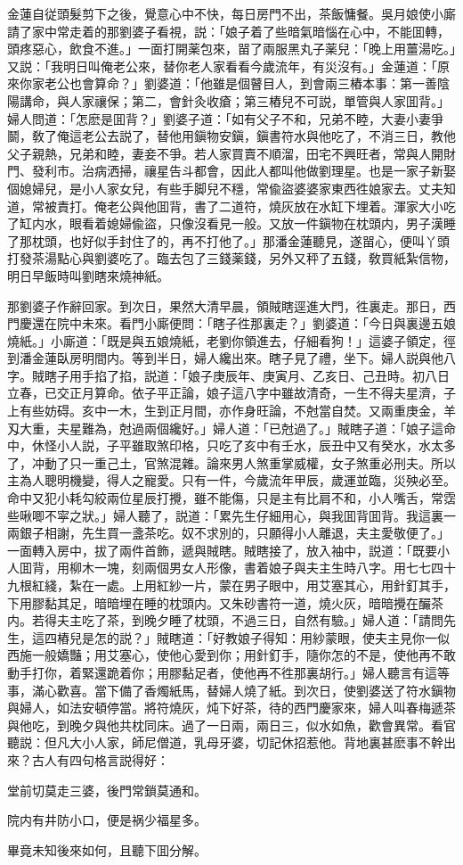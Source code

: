 金蓮自従頭髮剪下之後，覺意心中不快，每日房門不出，茶飯慵餐。吳月娘使小廝請了家中常走着的那劉婆子看視，説：「娘子着了些暗氣暗惱在心中，不能囬轉，頭疼惡心，飲食不進。」一面打開薬包來，㽞了兩服黑丸子薬兒：「晚上用薑湯吃。」又説：「我明日叫俺老公來，替你老人家看看今歲流年，有災沒有。」金蓮道：「原來你家老公也會算命？」劉婆道：「他雖是個瞽目人，到會兩三樁本事：第一善陰陽講命，與人家禳保；第二，會針灸收瘡；第三樁兒不可説，單管與人家囬背。」婦人問道：「怎麽是囬背？」劉婆子道：「如有父子不和，兄弟不睦，大妻小妻爭鬬，敎了俺這老公去説了，替他用鎭物安鎭，鎭書符水與他吃了，不消三日，教他父子親熱，兄弟和睦，妻妾不爭。若人家買賣不順溜，田宅不興旺者，常與人開財門、發利市。治病洒掃，禳星告斗都會，因此人都叫他做劉理星。也是一家子新娶個媳婦兒，是小人家女兒，有些手脚兒不穩，常偸盜婆婆家東西徃娘家去。丈夫知道，常被責打。俺老公與他囬背，書了二道符，燒灰放在水缸下埋着。渾家大小吃了缸内水，眼看着媳婦偸盜，只像沒看見一般。又放一件鎭物在枕頭内，男子漢睡了那枕頭，也好似手封住了的，再不打他了。」那潘金蓮聽見，遂㽞心，便叫丫頭打發茶湯點心與劉婆吃了。臨去包了三錢薬錢，另外又秤了五錢，敎買紙紮信物，明日早飯時叫劉瞎來燒神紙。

那劉婆子作辭回家。到次日，果然大清早晨，領賊瞎逕進大門，徃裏走。那日，西門慶還在院中未來。看門小廝便問：「瞎子徃那裏走？」劉婆道：「今日與裏邊五娘燒紙。」小廝道：「既是與五娘燒紙，老劉你領進去，仔細看狗！」這婆子領定，徑到潘金蓮臥房明間内。等到半日，婦人纔出來。瞎子見了禮，坐下。婦人説與他八字。賊瞎子用手掐了掐，説道：「娘子庚辰年、庚寅月、乙亥日、己丑時。初八日立春，已交正月算命。依子平正論，娘子這八字中雖故清奇，一生不得夫星濟，子上有些妨碍。亥中一木，生到正月間，亦作身旺論，不尅當自焚。又兩重庚金，羊刄大重，夫星難為，尅過兩個纔好。」婦人道：「已尅過了。」賊瞎子道：「娘子這命中，休怪小人説，子平雖取煞印格，只吃了亥中有壬水，辰丑中又有癸水，水太多了，冲動了只一重己土，官煞混雜。論來男人煞重掌威權，女子煞重必刑夫。所以主為人聰明機變，得人之寵愛。只有一件，今歲流年甲辰，歲運並臨，災殃必至。命中又犯小耗勾絞兩位星辰打攪，雖不能傷，只是主有比肩不和，小人嘴舌，常霑些啾唧不寜之狀。」婦人聽了，説道：「累先生仔細用心，與我囬背囬背。我這裏一兩銀子相謝，先生買一盞茶吃。奴不求別的，只願得小人離退，夫主愛敬便了。」一面轉入房中，拔了兩件首飾，遞與賊瞎。賊瞎接了，放入袖中，説道：「既要小人囬背，用柳木一塊，刻兩個男女人形像，書着娘子與夫主生時八字。用七七四十九根紅綫，紮在一處。上用紅紗一片，蒙在男子眼中，用艾塞其心，用針釘其手，下用膠黏其足，暗暗埋在睡的枕頭内。又朱砂書符一道，燒火灰，暗暗攪在釅茶内。若得夫主吃了茶，到晚夕睡了枕頭，不過三日，自然有驗。」婦人道：「請問先生，這四樁兒是怎的説？」賊瞎道：「好教娘子得知：用紗蒙眼，使夫主見你一似西施一般嬌豔；用艾塞心，使他心愛到你；用針釘手，隨你怎的不是，使他再不敢動手打你，着緊還跪着你；用膠黏足者，使他再不徃那裏胡行。」婦人聽言有這等事，滿心歡喜。當下備了香燭紙馬，替婦人燒了紙。到次日，使劉婆送了符水鎭物與婦人，如法安頓停當。將符燒灰，炖下好茶，待的西門慶家來，婦人叫春梅遞茶與他吃，到晚夕與他共枕同床。過了一日兩，兩日三，似水如魚，歡會異常。看官聽説：但凡大小人家，師尼僧道，乳母牙婆，切記休招惹他。背地裏甚麽事不幹出來？古人有四句格言説得好：

\begin{myquote}
堂前切莫走三婆，後門常鎖莫通和。

院内有井防小口，便是祸少福星多。
\end{myquote}

畢竟未知後來如何，且聽下囬分解。

